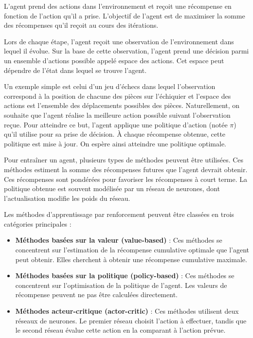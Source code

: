 \documentclass[french]{article}
\begin{document}
L'agent prend des actions dans l'environnement et reçoit une récompense en fonction de l'action qu'il a prise. 
L'objectif de l'agent est de maximiser la somme des récompenses qu'il reçoit au cours des itérations.

\vspace{0.5cm}
Lors de chaque étape, l'agent reçoit une observation de l'environnement dans lequel il évolue. Sur la base 
de cette observation, l'agent prend une décision parmi un ensemble d'actions possible appelé espace des actions. 
Cet espace peut dépendre de l'état dans lequel se trouve l'agent.

\vspace{0.5cm}
Un exemple simple est celui d'un jeu d'échecs dans lequel l'observation correspond à la position de chacune des 
pièces sur l'échiquier et l'espace des actions est l'ensemble des déplacements possibles des pièces. 
Naturellement, on souhaite que l'agent réalise la meilleure action possible suivant l'observation reçue. 
Pour atteindre ce but, l'agent applique une politique d'action (notée $\pi$) qu'il utilise pour sa prise de décision.
À chaque récompense obtenue, cette politique est mise à jour. On espère ainsi atteindre une politique optimale.

\vspace{0.5cm}
Pour entraîner un agent, plusieurs types de méthodes peuvent être utilisées. Ces méthodes estiment la somme des 
récompenses futures que l'agent devrait obtenir. Ces récompenses sont pondérées pour favoriser les récompenses 
à court terme. La politique obtenue est souvent modélisée par un réseau de neurones, dont l'actualisation modifie 
les poids du réseau.

\vspace{0.5cm}
\noindent
Les méthodes d'apprentissage par renforcement peuvent être classées en trois catégories principales :
\begin{itemize}
\item \textbf{Méthodes basées sur la valeur (value-based)} : Ces méthodes se concentrent sur l'estimation de la récompense cumulative optimale que l'agent peut obtenir. Elles cherchent à obtenir une récompense cumulative maximale.
\item \textbf{Méthodes basées sur la politique (policy-based)} : Ces méthodes se concentrent sur l'optimisation de la politique de l'agent. Les valeurs de récompense peuvent ne pas être calculées directement.
\item \textbf{Méthodes acteur-critique (actor-critic)} : Ces méthodes utilisent deux réseaux de neurones. Le premier réseau choisit l'action à effectuer, tandis que le second réseau évalue cette action en la comparant à l'action prévue.
\end{itemize}
\end{document}

